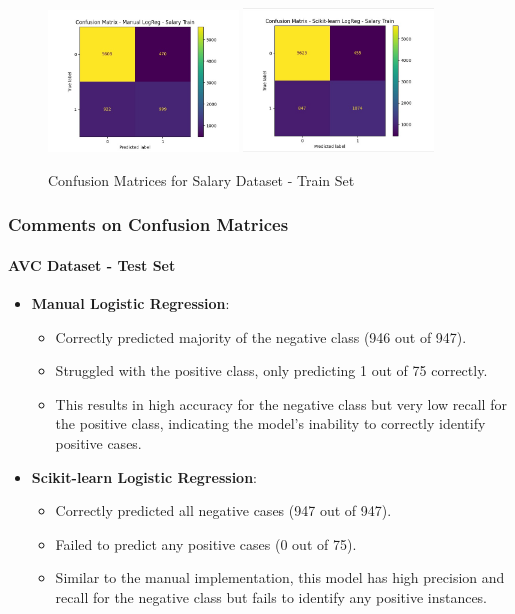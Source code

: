 \documentclass[a4paper,12pt]{article}
\begin{document}
\begin{figure}[H]
    \centering
    \includegraphics[width=0.45\textwidth]{Resources/logreg_manual_confusion_salary_train.jpeg}
    \includegraphics[width=0.45\textwidth]{Resources/logreg_scikit_confusion_salary_train.jpeg}
    \caption{Confusion Matrices for Salary Dataset - Train Set}
    \label{fig:confusion_salary_train}
\end{figure}

\subsubsection{Comments on Confusion Matrices}

\paragraph{AVC Dataset - Test Set}
\begin{itemize}
    \item \textbf{Manual Logistic Regression}:
    \begin{itemize}
        \item Correctly predicted majority of the negative class (946 out of 947).
        \item Struggled with the positive class, only predicting 1 out of 75 correctly.
        \item This results in high accuracy for the negative class but very low recall for the positive class, indicating the model's inability to correctly identify positive cases.
    \end{itemize}
    \item \textbf{Scikit-learn Logistic Regression}:
    \begin{itemize}
        \item Correctly predicted all negative cases (947 out of 947).
        \item Failed to predict any positive cases (0 out of 75).
        \item Similar to the manual implementation, this model has high precision and recall for the negative class but fails to identify any positive instances.
    \end{itemize}
\end{itemize}
\end{document}
